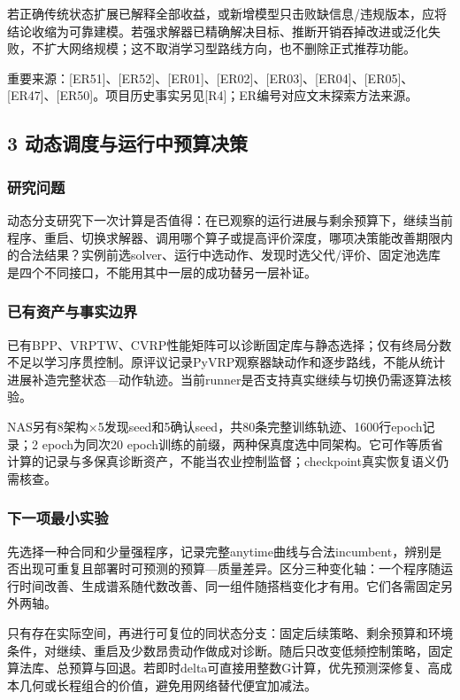 \documentclass[11pt,a4paper]{article}
\newcommand{\bodytext}[1]{#1\par}
\newcommand{\sourcetext}[1]{{\fontsize{9.2}{14}\selectfont\color{Muted}#1\par}}
\begin{document}
\bodytext{若正确传统状态扩展已解释全部收益，或新增模型只击败缺信息/\allowbreak{}违规版本，应将结论收缩为可靠建模。若强求解器已精确解决目标、推断开销吞掉改进或泛化失败，不扩大网络规模；这不取消学习型路线方向，也不删除正式推荐功能。}
\sourcetext{重要来源：[ER51]、[ER52]、[ER01]、[ER02]、[ER03]、[ER04]、[ER05]、[ER47]、[ER50]。项目历史事实另见[R4]；ER编号对应文末探索方法来源。}
\subsection{3  动态调度与运行中预算决策}
\subsubsection{研究问题}
\bodytext{动态分支研究下一次计算是否值得：在已观察的运行进展与剩余预算下，继续当前程序、重启、切换求解器、调用哪个算子或提高评价深度，哪项决策能改善期限内的合法结果？实例前选solver、运行中选动作、发现时选父代/\allowbreak{}评价、固定池选库是四个不同接口，不能用其中一层的成功替另一层补证。}
\subsubsection{已有资产与事实边界}
\bodytext{已有BPP、VRPTW、CVRP性能矩阵可以诊断固定库与静态选择；仅有终局分数不足以学习序贯控制。原评议记录PyVRP观察器缺动作和逐步路线，不能从统计进展补造完整状态—动作轨迹。当前runner是否支持真实继续与切换仍需逐算法核验。}
\bodytext{NAS另有8架构×5发现seed和5确认seed，共80条完整训练轨迹、1600行epoch记录；2 epoch为同次20 epoch训练的前缀，两种保真度选中同架构。它可作等质省计算的记录与多保真诊断资产，不能当农业控制监督；checkpoint真实恢复语义仍需核查。}
\subsubsection{下一项最小实验}
\bodytext{先选择一种合同和少量强程序，记录完整anytime曲线与合法incumbent，辨别是否出现可重复且部署时可预测的预算—质量差异。区分三种变化轴：一个程序随运行时间改善、生成谱系随代数改善、同一组件随搭档变化才有用。它们各需固定另外两轴。}
\bodytext{只有存在实际空间，再进行可复位的同状态分支：固定后续策略、剩余预算和环境条件，对继续、重启及少数昂贵动作做成对诊断。随后只改变低频控制策略，固定算法库、总预算与回退。若即时delta可直接用整数G计算，优先预测深修复、高成本几何或长程组合的价值，避免用网络替代便宜加减法。}
\end{document}
